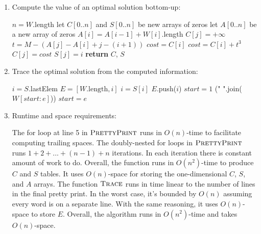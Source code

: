 \documentclass[11pt]{article}
\theoremstyle{definition}
\theoremstyle{theorem}
\begin{document}
\begin{enumerate}[label=(\arabic*)]
\item Compute the value of an optimal solution bottom-up:

\begin{algorithmic}[1]
	\State $n = W.$length
	\State let $C[0..n]$ and $S[0..n]$ be new arrays of zeros 
	\State let $A[0..n]$ be a new array of zeros  
		\State $A[i] = A[i-1] + W[i]$.length
	\EndFor
		\State $C[j] = +\infty$
			\State $t = M - (A[j] - A[i] + j - (i + 1))$ 
					\State $\textit{cost} = C[i]$
				\Else
					\State $\textit{cost} = C[i] + t^3$
				\EndIf
					\State $C[j] = \textit{cost}$
					\State $S[j] = i$
				\EndIf
			\EndIf
		\EndFor
	\EndFor
	\State \textbf{return} $C$, $S$
\EndFunction
\end{algorithmic}

\item Trace the optimal solution from the computed information:
\begin{algorithmic}[1]
	\State $i = S.$lastElem 
	\State $E = [W.\text{length}, i]$ 
		\State $i = S[i]$ 
		\State $E.$push($i$)
	\EndWhile
	\State $\textit{start} = 1$
		\State {}(" ".join($W[\textit{start}: e]$)) 
		\State $\textit{start} = e$
	\EndFor
\EndFunction
\end{algorithmic}

\item Runtime and space requirements:

The for loop at line 5 in $\textproc{\textsc{PrettyPrint}}$ runs in $O(n)$-time to facilitate computing trailing spaces. The doubly-nested for loops in $\textproc{\textsc{PrettyPrint}}$ runs $1 + 2 + ... + (n - 1) + n$ iterations. In each iteration there is constant amount of work to do. Overall, the function runs in $O(n^2)$-time to produce $C$ and $S$ tables. It uses $O(n)$-space for storing the one-dimensional $C$, $S$, and $A$ arrays. The function $\textproc{\textsc{Trace}}$ runs in time linear to the number of lines in the final pretty print. In the worst case, it's bounded by $O(n)$ assuming every word is on a separate line. With the same reasoning, it uses $O(n)$-space to store $E$. Overall, the algorithm runs in $O(n^2)$-time and takes $O(n)$-space.

\end{enumerate}
\end{document}
